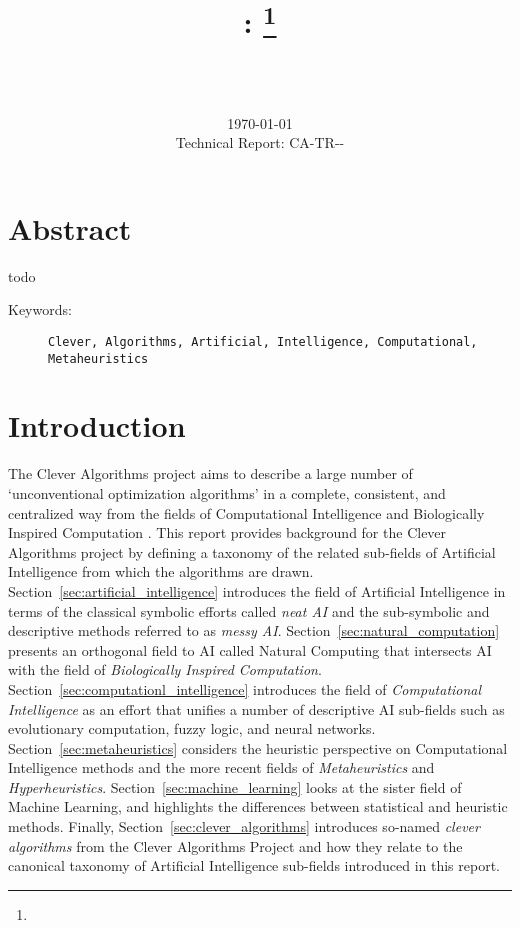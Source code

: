 \documentclass[a4paper, 11pt]{article}
\title{{\myreporttitle}: {\myreportsubtitle}\footnote{\myreportlicense}}
\author{\myreportauthor\\{\myreportemail}\\\small\myreportproject}
\date{\today\\{\small{Technical Report: CA-TR-{\myreportdate}-\myreportversion}}}
\begin{document}
\maketitle

\section*{Abstract} 
todo

\begin{description}
	\item[Keywords:] {\small\texttt{Clever, Algorithms, Artificial, Intelligence, Computational, Metaheuristics}}
\end{description} 

\section{Introduction}
\label{sec:introduction}
The Clever Algorithms project aims to describe a large number of `unconventional optimization algorithms' in a complete, consistent, and centralized way from the fields of Computational Intelligence and Biologically Inspired Computation \cite{Brownlee2010}.
This report provides background for the Clever Algorithms project by defining a taxonomy of the related sub-fields of Artificial Intelligence from which the algorithms are drawn.
Section~\ref{sec:artificial_intelligence} introduces the field of Artificial Intelligence in terms of the classical symbolic efforts called \emph{neat AI} and the sub-symbolic and descriptive methods referred to as \emph{messy AI}. Section~\ref{sec:natural_computation} presents an orthogonal field to AI called Natural Computing that intersects AI with the field of \emph{Biologically Inspired Computation}. Section~\ref{sec:computationl_intelligence} introduces the field of \emph{Computational Intelligence} as an effort that unifies a number of descriptive AI sub-fields such as evolutionary computation, fuzzy logic, and neural networks. Section~\ref{sec:metaheuristics} considers the heuristic perspective on Computational Intelligence methods and the more recent fields of \emph{Metaheuristics} and \emph{Hyperheuristics}. Section~\ref{sec:machine_learning} looks at the sister field of Machine Learning, and highlights the differences between statistical and heuristic methods. Finally, Section~\ref{sec:clever_algorithms} introduces so-named \emph{clever algorithms} from the Clever Algorithms Project and how they relate to the canonical taxonomy of Artificial Intelligence sub-fields introduced in this report.
\end{document}
